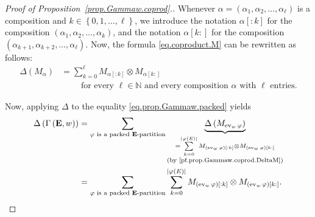 \documentclass[12pt]{article}
\theoremstyle{plain}
\theoremstyle{definition}
\theoremstyle{remark}
\let\sumnonlimits\sum
\renewcommand{\sum}{\sumnonlimits\limits}
\newcommand{\ev}{\operatorname{ev}}
\newcommand{\EE}{{\mathbf{E}}}
\newcommand{\NN}{{\mathbb{N}}}
\begin{document}
\begin{proof}[Proof of Proposition~\ref{prop.Gammaw.coprod}.]
Whenever
$\alpha = \left(\alpha_1, \alpha_2, \ldots, \alpha_\ell\right)$
is a composition and \newline
$k \in \left\{0, 1, \ldots, \ell\right\}$,
we introduce the notation
$\alpha\left[:k\right]$ for the composition
$\left(\alpha_1, \alpha_2, \ldots, \alpha_k\right)$, and the
notation $\alpha\left[k:\right]$ for the composition
$\left(\alpha_{k+1}, \alpha_{k+2}, \ldots, \alpha_\ell\right)$.
Now, the formula \eqref{eq.coproduct.M} can be rewritten as
follows:
\begin{align}
\label{pf.prop.Gammaw.coprod.DeltaM}
\Delta \left( M_\alpha \right)
&= \sum_{k=0}^{\ell} M_{\alpha\left[:k\right]}
\otimes M_{\alpha\left[k:\right]} \\
& \qquad \text{ for every } \ell \in \NN \text{ and every composition } \alpha
\text{ with } \ell \text{ entries.} \nonumber
\end{align}

Now, applying $\Delta$ to the equality
\eqref{eq.prop.Gammaw.packed} yields
\begin{align}
\Delta\left(\Gamma\left(\EE , w\right)\right)
&= \sum_{\varphi \text{ is a packed } \EE\text{-partition}}
\underbrace{\Delta\left(M_{\ev_w \varphi}\right)}_{
  \substack{ = \sum_{k=0}^{\left|\varphi\left(E\right)\right|}
  M_{\left(\ev_w \varphi\right)\left[:k\right]} \otimes
  M_{\left(\ev_w \varphi\right)\left[k:\right]} \\
  \text{(by \eqref{pf.prop.Gammaw.coprod.DeltaM})} }}
 \nonumber \\
&= \sum_{\varphi \text{ is a packed } \EE\text{-partition}}
\sum_{k=0}^{\left|\varphi\left(E\right)\right|}
M_{\left(\ev_w \varphi\right)\left[:k\right]} \otimes
M_{\left(\ev_w \varphi\right)\left[k:\right]} .
\label{pf.Gammaw.coprod.lhs}
\end{align}


\end{proof}
\end{document}
